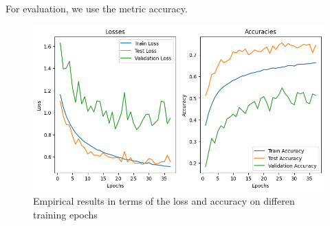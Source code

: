 For evaluation, we use the metric accuracy.

\begin{figure}[ht]
  \centering
   \includegraphics[width=0.95\linewidth]{output.png}
   \caption{Empirical results in terms of the loss and accuracy on differen training epochs}
   \label{fig:result}
\end{figure}